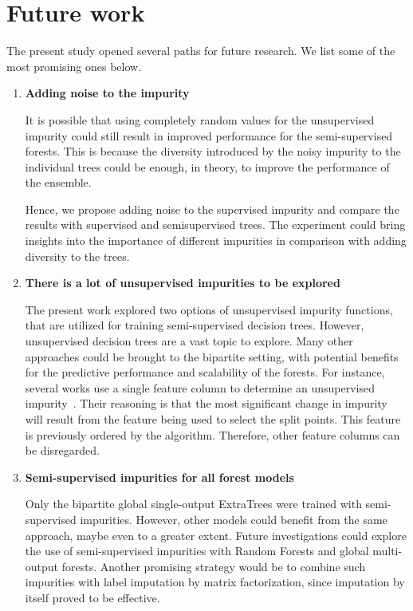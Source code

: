 \section{Future work}

The present study opened several paths for future research. We list some of the most promising ones below.

\begin{enumerate}
    \item \textbf{Adding noise to the impurity}

    It is possible that using completely random values for the unsupervised impurity could still result in improved performance for the semi-supervised forests. This is because the diversity introduced by the noisy impurity to the individual trees could be enough, in theory, to improve the performance of the ensemble.

    Hence, we propose adding noise to the supervised impurity and compare the results with supervised and semisupervised trees. The experiment could bring insights into the importance of different impurities in comparison with adding diversity to the trees.


    \item \textbf{There is a lot of unsupervised impurities to be explored}

    The present work explored two options of unsupervised impurity functions, that are utilized for training semi-supervised decision trees. However, unsupervised decision trees are a vast topic to explore. Many other approaches could be brought to the bipartite setting, with potential benefits for the predictive performance and scalability of the forests.
    For instance, several works use a single feature column to determine an unsupervised impurity~\cite{}. Their reasoning is that the most significant change in impurity will result from the feature being used to select the split points. This feature is previously ordered by the algorithm. Therefore, other feature columns can be disregarded.

    \item \textbf{Semi-supervised impurities for all forest models}

    Only the bipartite global single-output ExtraTrees were trained with semi-supervised impurities. However, other models could benefit from the same approach, maybe even to a greater extent. Future investigations could explore the use of semi-supervised impurities with Random Forests and global multi-output forests. Another promising strategy would be to combine such impurities with label imputation by matrix factorization, since imputation by itself proved to be effective.


\end{enumerate}
